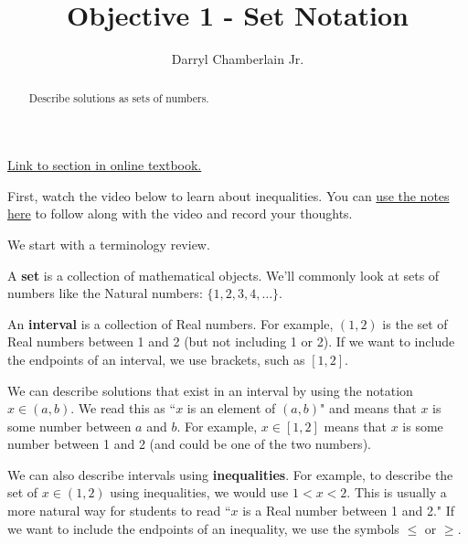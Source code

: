 \documentclass{ximera}
\author{Darryl Chamberlain Jr.}
\title{Objective 1 - Set Notation}
\begin{document}
\begin{abstract}
Describe solutions as sets of numbers. 
\end{abstract}
\maketitle

\href{https://cnx.org/contents/mwjClAV_@8.1:uIjtHMfW@9/Linear-Inequalities-and-Absolute-Value-Inequalities}{Link to section in online textbook.}

First, watch the video below to learn about inequalities. You can \href{http://people.clas.ufl.edu/dchamberlain31/files/M3-Objective-1-Set-Notation-1.pdf}{use the notes here} to follow along with the video and record your thoughts.



We start with a terminology review. 

A \textbf{set} is a collection of mathematical objects. We'll commonly look at sets of numbers like the Natural numbers: $\{ 1, 2, 3, 4, \ldots \}$. 

An \textbf{interval} is a collection of Real numbers. For example, $(1, 2)$ is the set of Real numbers between 1 and 2 (but not including 1 or 2). If we want to include the endpoints of an interval, we use brackets, such as $[1, 2]$. 

We can describe solutions that exist in an interval by using the notation $x \in (a, b)$. We read this as ``$x$ is an element of $(a, b)$" and means that $x$ is some number between $a$ and $b$. For example, $x \in [1, 2]$ means that $x$ is some number between 1 and 2 (and could be one of the two numbers). 

We can also describe intervals using \textbf{inequalities}. For example, to describe the set of $x \in (1, 2)$ using inequalities, we would use $1 < x < 2$. This is usually a more natural way for students to read ``$x$ is a Real number between 1 and 2." If we want to include the endpoints of an inequality, we use the symbols $\leq$ or $\geq$. 
\end{document}

